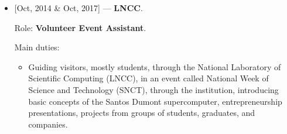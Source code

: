 \begin{itemize}
  \item {[Oct, 2014 \& Oct, 2017]} --- \textbf{LNCC}.

    Role: \textbf{Volunteer Event Assistant}.

    Main duties:

    \vspace{-0.5em}
    \begin{itemize}
      \item Guiding visitors, mostly students, through the National Laboratory of
        Scientific Computing (LNCC), in an event called National Week of Science and
        Technology (SNCT), through the institution, introducing basic concepts of
        the Santos Dumont supercomputer, entrepreneurship presentations, projects
        from groups of students, graduates, and companies.
    \end{itemize}
\end{itemize}
